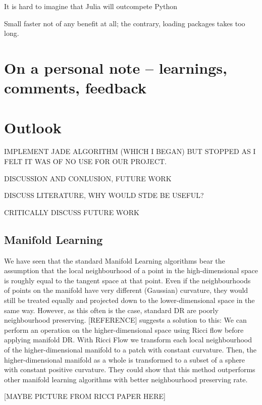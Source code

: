 \documentclass[journal, a4paper]{IEEEtran}
\begin{document}
It is hard to imagine that Julia will outcompete Python 

Small faster not of any benefit at all; the contrary, loading packages takes too long. 




\section{On a personal note -- learnings, comments, feedback } %




\section{Outlook}

IMPLEMENT JADE ALGORITHM (WHICH I BEGAN) BUT STOPPED AS I FELT IT WAS OF NO USE FOR OUR PROJECT. 

DISCUSSION AND CONLUSION, FUTURE WORK

DISCUSS LITERATURE, WHY WOULD STDE BE USEFUL?

CRITICALLY DISCUSS FUTURE WORK



\subsection{Manifold Learning}

We have seen that the standard Manifold Learning algorithms bear the assumption that the local neighbourhood of a point in the high-dimensional space is roughly equal to the tangent space at that point. Even if the neighbourhoods of points on the manifold have very different (Gaussian) curvature, they would still be treated equally and projected down to the lower-dimensional space in the same way. However, as this often is the case, standard DR are poorly neighbourhood preserving. [REFERENCE] suggests a solution to this: We can perform an operation on the higher-dimensional space using Ricci flow before applying manifold DR. With Ricci Flow we transform each local neighbourhood of the higher-dimensional manifold to a patch with constant curvature. Then, the higher-dimensional manifold as a whole is transformed to a subset of a sphere with constant positive curvature. They could show that this method outperforms other manifold learning algorithms with better neighbourhood preserving rate.

[MAYBE PICTURE FROM RICCI PAPER HERE]
\end{document}
